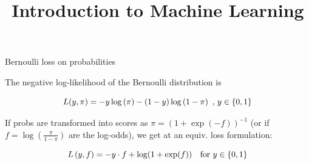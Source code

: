 \documentclass[11pt,compress,t,notes=noshow, xcolor=table]{beamer}
\title{Introduction to Machine Learning}
\begin{document}
    

\begin{vbframe}{Bernoulli loss on probabilities}

The negative log-likelihood of the Bernoulli distribution is

  $$
    L(y, \pi) = - y \log \left(\pi\right) - (1 - y) \log \left(1 - \pi\right)\,\,, \, y \in \{0, 1\} 
  $$
  
If probs are transformed into scores as $\pi = \left(1 + \exp(-f)\right)^{-1}$ (or if $f = \log\left(\frac{\pi}{1 - \pi}\right)$ are the log-odds), we get at an equiv. loss formulation:

$$L\left(y, f\right) = - y \cdot f + \log(1 + \exp(f)) \quad \text{for } y \in \{0, 1\}$$

\begin{center}
\begin{figure}
  \\
\end{figure}
\end{center}

\end{vbframe}
\end{document}

